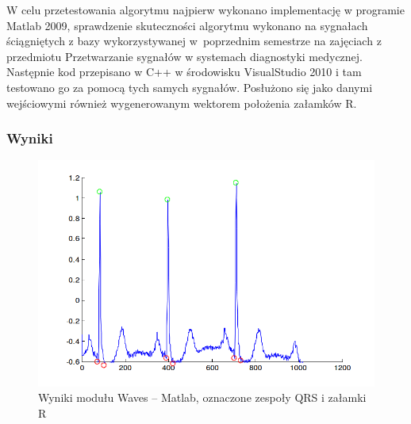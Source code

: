 \documentclass[a4paper, 11pt]{article}
\begin{document}
W celu przetestowania algorytmu najpierw wykonano implementację w programie Matlab 2009, sprawdzenie skuteczności algorytmu wykonano na sygnałach ściągniętych z bazy wykorzystywanej w~poprzednim semestrze na zajęciach z przedmiotu Przetwarzanie sygnałów w systemach diagnostyki medycznej. 
Następnie kod przepisano w C++ w środowisku VisualStudio 2010 i tam testowano go za pomocą tych samych sygnałów. Posłużono się jako danymi wejściowymi również wygenerowanym wektorem położenia załamków R.

\subsubsection{Wyniki}
\label{sec:waves:results}
\begin{center}
%
\begin{figure}
\begin{centering}
\includegraphics[scale=0.4]{include/waves_matlab}
\par\end{centering}

\caption{Wyniki modułu Waves -- Matlab, oznaczone zespoły QRS i załamki R}
\label{fig:waves_matlab}
\end{figure}

\par\end{center}
\end{document}
